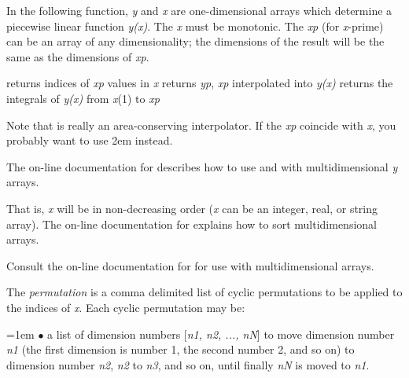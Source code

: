 In the following function, {\it y\/} and {\it x\/} are one-dimensional
arrays which determine a piecewise linear function {\it y(x)}.  The {\it x\/}
must be monotonic.  The {\it xp\/} (for {\it x\/}-prime) can be an
array of any dimensionality; the dimensions of the result will be the
same as the dimensions of {\it xp}.

     {returns indices of {\it xp\/} values in {\it x}}
     {returns {\it yp}, {\it xp\/} interpolated into {\it y(x)}}
     {returns the integrals of {\it y(x)\/} from {\it x\/}(1) to {\it xp}}

Note that  is really an area-conserving interpolator.  If
the {\it xp} coincide with {\it x}, you probably want to use \hfil\break
\hglue2em  \hfil\break
instead.

The on-line  documentation for  describes how to
use  and  with multidimensional {\it y} arrays.



That is, {\it x\/} will be in non-decreasing order
({\it x\/} can be an integer, real, or string array).  The on-line
 documentation for  explains how to sort
multidimensional arrays.


Consult the on-line  documentation for  for use
with multidimensional arrays.



The {\it permutation\/} is a comma delimited list of cyclic permutations
to be applied to the indices of {\it x}.  Each cyclic permutation may
be:

\hangindent=1em
$\bullet$ a list of dimension numbers [{\it n1, n2, ..., nN\/}] \hfil\break
to move dimension number {\it n1\/} (the first dimension is number 1, the
second number 2, and so on) to dimension number {\it n2\/}, {\it n2\/} to
{\it n3\/}, and so on, until finally {\it nN\/} is moved to {\it n1\/}.

